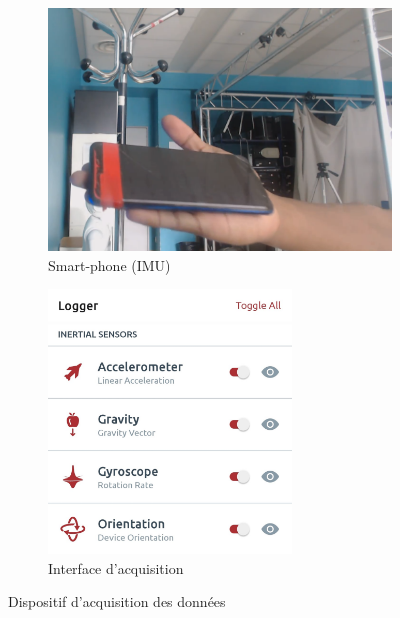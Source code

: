 \documentclass[5pt]{article}
\begin{document}
\begin{figure}[H]
    \begin{subfigure}{0.5\textwidth}
        \centering
        \includegraphics[width=\linewidth]{../phone.png}
        \caption{Smart-phone (IMU)}
        \label{subfig:phone}
    \end{subfigure}
    \begin{subfigure}{0.5\textwidth}
        \centering
        \includegraphics[width=\linewidth, height=7cm]{../apkk.jpg}
        \caption{Interface d'acquisition}
        \label{subfig:apk}
    \end{subfigure}
    \caption{Dispositif d'acquisition des données}
    \label{fig:data}
\end{figure}
\end{document}
